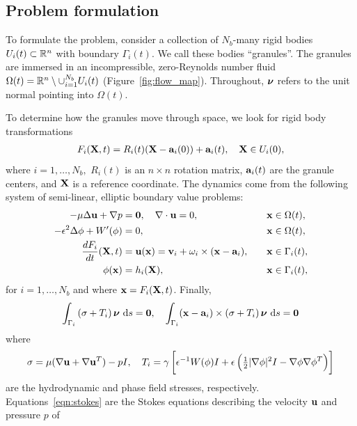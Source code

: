 \subsection{Problem formulation}
To formulate the problem, consider a collection of $N_b$-many rigid
bodies $U_i(t) \subset \RR^n$ with boundary $\Gamma_i(t)$. We call these
bodies ``granules''. The granules are immersed in an incompressible,
zero-Reynolds number fluid $\Omega(t) = \RR^n \setminus \cup_{i=1}^{N_b}
U_i(t)$ (Figure~\ref{fig:flow_map}). Throughout, $\nnu$ refers to
the unit normal pointing into $\Omega(t)$.

To determine how the granules move through space,
we look for rigid body transformations
\begin{align}
\label{eq:RBT}
  F_i(\XX,t) = R_i(t)(\XX - \aa_i(0)) + \aa_i(t),\quad \XX \in U_i(0),
\end{align}
where $i = 1,\ldots,N_b,$ $R_i(t)$ is an $n
\times n$ rotation matrix, $\aa_i(t)$ are the granule centers, and $\XX$ is a
reference coordinate.
The dynamics come from the following system of semi-linear, elliptic boundary value problems:
\begin{alignat}{4}
  \label{eqn:stokes} 
  -\mu\Delta \uu + \nabla p &= \mathbf{0}, 
  \quad \nabla \cdot \uu = 0, &&\xx \in \Omega(t), \\
  \label{eqn:phase}
  -\epsilon^2 \Delta \phi + W'(\phi) &= 0, &&\xx \in \Omega(t),\\
  \label{eqn:noslip}        
  \frac{dF_i}{dt}(\XX,t) & = \uu(\xx) = 
    \vv_i + \omega_i \times (\xx - \aa_i), 
  \quad &&\xx \in \Gamma_i(t),\\
  \label{eqn:material}
  \phi(\xx) &= h_i(\XX),  &&\xx \in \Gamma_i(t),
\end{alignat}
for $i=1,\ldots,N_b$ and where $\xx = F_i(\XX,t)$.  Finally,
\begin{align}
\label{eqn:stressbalance}
\int_{\Gamma_i} \left(\sigma  + T_i\right)\nnu \,\dif s = \mathbf{0},\quad
\int_{\Gamma_i} (\xx - \aa_i)\times \left(\sigma + T_i\right) \nnu \,\dif s = \mathbf{0}
\end{align}
where
\begin{align}
\label{eqn:hydro_stress}
\sigma = \mu(\nabla \uu + \nabla \uu^T) - pI,\quad 
T_i = \gamma\left[\epsilon^{-1} W(\phi)I
  + \epsilon\left(\tfrac{1}{2}|\nabla \phi|^2I - \nabla \phi \nabla
  \phi^T\right)\right]
\end{align}
are the hydrodynamic and phase field stresses, respectively.
Equations~\eqref{eqn:stokes} are the Stokes equations 
describing the velocity $\uu$ and pressure $p$ of
